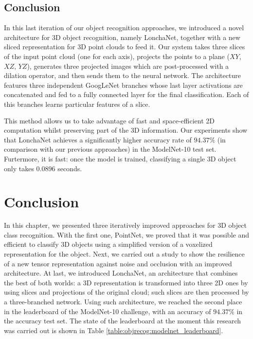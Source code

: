 \subsection{Conclusion}
\label{cha:objrecog:sec:lonchanet:subsec:conclusion}

In this last iteration of our object recognition approaches, we introduced a novel architecture for \acs{3D} object recognition, namely LonchaNet, together with a new sliced representation for \acs{3D} point clouds to feed it. Our system takes three slices of the input point cloud (one for each axis), projects the points to a plane ($XY$, $XZ$, $YZ$), generates three projected images which are post-processed with a dilation operator, and then sends them to the neural network. The architecture features three independent GoogLeNet branches whose last layer activations are concatenated and fed to a fully connected layer for the final classification. Each of this branches learns particular features of a slice.

This method allows us to take advantage of fast and space-efficient \acs{2D} computation whilst preserving part of the \acs{3D} information. Our experiments show that LonchaNet achieves a significantly higher accuracy rate of $94.37\%$ (in comparison with our previous approaches) in the ModelNet-10 test set. Furtermore, it is fast: once the model is trained, classifying a single \acs{3D} object only takes $0.0896$ seconds.

\section{Conclusion}
\label{cha:objrecog:sec:conclusion}

In this chapter, we presented three iteratively improved approaches for \acs{3D} object class recognition. With the first one, PointNet, we proved that it was possible and efficient to classify \acs{3D} objects using a simplified version of a voxelized representation for the object. Next, we carried out a study to show the resilience of a new tensor representation against noise and occlusion with an improved architecture. At last, we introduced LonchaNet, an architecture that combines the best of both worlds: a \acs{3D} representation is transformed into three \acs{2D} ones by using slices and projections of the original cloud; such slices are then processed by a three-branched network. Using such architecture, we reached the second place in the leaderboard of the ModelNet-10 challenge, with an accuracy of $94.37\%$ in the accuracy test set. The state of the leaderboard at the moment this research was carried out is shown in Table \ref{table:objrecog:modelnet_leaderboard}.

